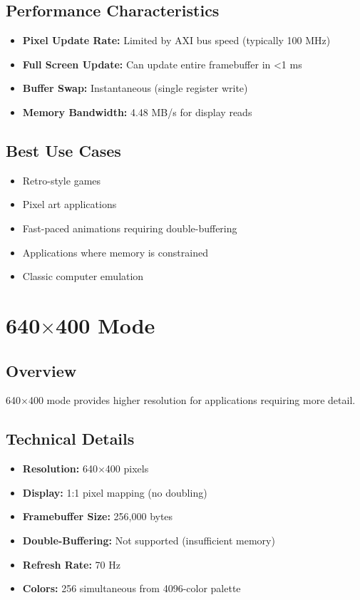 \documentclass[11pt,letterpaper]{report}
\begin{document}
\subsection{Performance Characteristics}

\begin{itemize}
    \item \textbf{Pixel Update Rate:} Limited by AXI bus speed (typically 100 MHz)
    \item \textbf{Full Screen Update:} Can update entire framebuffer in \textless 1 ms
    \item \textbf{Buffer Swap:} Instantaneous (single register write)
    \item \textbf{Memory Bandwidth:} 4.48 MB/s for display reads
\end{itemize}

\subsection{Best Use Cases}

\begin{itemize}
    \item Retro-style games
    \item Pixel art applications
    \item Fast-paced animations requiring double-buffering
    \item Applications where memory is constrained
    \item Classic computer emulation
\end{itemize}

\section{640$\times$400 Mode}

\subsection{Overview}

640$\times$400 mode provides higher resolution for applications requiring more detail.

\subsection{Technical Details}

\begin{itemize}
    \item \textbf{Resolution:} 640$\times$400 pixels
    \item \textbf{Display:} 1:1 pixel mapping (no doubling)
    \item \textbf{Framebuffer Size:} 256,000 bytes
    \item \textbf{Double-Buffering:} Not supported (insufficient memory)
    \item \textbf{Refresh Rate:} 70 Hz
    \item \textbf{Colors:} 256 simultaneous from 4096-color palette
\end{itemize}
\end{document}
